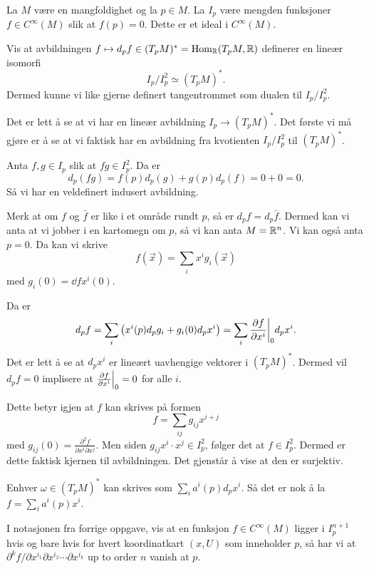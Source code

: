 \documentclass[11pt, english]{article}
\begin{document}
\begin{exc}
La $M$ være en mangfoldighet og la $p \in M$.  La $I_p$ være mengden funksjoner $f \in C^\infty(M)$ slik at $f(p)=0$. Dette er et ideal i $C^\infty(M)$. 

Vis at avbildningen $f \mapsto d_p f\in (T_pM)^\ast = \operatorname{Hom}_{\mathbb{R}}(T_pM ,\mathbb{R})$ definerer en lineær isomorfi
$$
I_p/I_p^2 \simeq (T_p M)^\ast.
$$
Dermed kunne vi like gjerne definert tangentrommet som dualen til $I_p/I_p^2$. 
\end{exc}
\begin{sol}
Det er lett å se at vi har en lineær avbildning $I_p \to (T_pM)^\ast$. Det første vi må gjøre er å se at vi faktisk har en avbildning fra kvotienten $I_p/I_p^2$ til $(T_pM)^\ast$.

Anta $f,g \in I_p$ slik at $fg \in I_p^2$. Da er
$$
d_p(fg) = f(p)d_p(g) + g(p)d_p(f) = 0+0=0.
$$
Så vi har en veldefinert indusert avbildning.

Merk at om $f$ og $\bar f$ er like i et område rundt $p$, så er $d_pf=d_p \bar f$. Dermed kan vi anta at vi jobber i en kartomegn om $p$, så vi kan anta $M=\mathbb{R}^n$. Vi kan også anta $p=0$. Da kan vi skrive
$$
f(\vec x) = \sum_i x^i g_i( \vec x)
$$
med $g_i(0)= \dd{f}{x^i}(0)$. 

Da er 
$$
d_pf = \sum_i \left( x^i(p) d_pg_i + g_i(0) d_px^i \right) = \sum_i \restr{\dd{f}{x^i}}{0} d_px^i.
$$
Det er lett å se at $d_p x^i$ er lineært uavhengige vektorer i $(T_pM)^\ast$. Dermed vil $d_pf = 0$ implisere at $\restr{\dd{f}{x^i}}{0}=0$ for alle $i$.

Dette betyr igjen at $f$ kan skrives på formen
$$
f = \sum_{ij} g_{ij} x^{i+j}
$$
med $g_{ij}(0) = \frac{\partial^2 f}{\partial x^i \partial x^j}$. Men siden $g_{ij}x^i \cdot x^j \in I_p^2$, følger det at $f \in I_p^2$. Dermed er dette faktisk kjernen til avbildningen. Det gjenstår å vise at den er surjektiv.

Enhver $\omega \in (T_pM) ^\ast$ kan skrives som $\sum_i a^i(p) d_px^i$. Så det er nok å la $f=\sum_i a^i(p) x^i$. 
\end{sol}

\begin{exc}
I notasjonen fra forrige oppgave, vis at en funksjon $f \in C^\infty (M)$ ligger i $I_p^{n+1}$ hvis og bare hvis for hvert koordinatkart $(x,U)$ som inneholder $p$, så har vi at $\partial^k f/ \partial x^{i_1} \partial x^{i_2} \cdots \partial x^{i_k}$ up to order $n$ vanish at $p$.
\end{exc}
\end{document}
